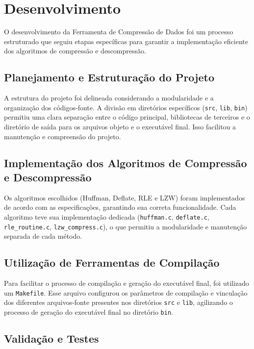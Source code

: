 \chapter{Desenvolvimento}
\label{cap:desenvolvimento}

O desenvolvimento da Ferramenta de Compressão de Dados foi um processo estruturado que seguiu etapas específicas para garantir a implementação eficiente dos algoritmos de compressão e descompressão.

\section{Planejamento e Estruturação do Projeto}

A estrutura do projeto foi delineada considerando a modularidade e a organização dos códigos-fonte. A divisão em diretórios específicos (\texttt{src}, \texttt{lib}, \texttt{bin}) permitiu uma clara separação entre o código principal, bibliotecas de terceiros e o diretório de saída para os arquivos objeto e o executável final. Isso facilitou a manutenção e compreensão do projeto.

\section{Implementação dos Algoritmos de Compressão e Descompressão}

Os algoritmos escolhidos (Huffman, Deflate, RLE e LZW) foram implementados de acordo com as especificações, garantindo sua correta funcionalidade. Cada algoritmo teve sua implementação dedicada (\texttt{huffman.c}, \texttt{deflate.c}, \texttt{rle\_routine.c}, \texttt{lzw\_compress.c}), o que permitiu a modularidade e manutenção separada de cada método.

\section{Utilização de Ferramentas de Compilação}

Para facilitar o processo de compilação e geração do executável final, foi utilizado um \texttt{Makefile}. Esse arquivo configurou os parâmetros de compilação e vinculação dos diferentes arquivos-fonte presentes nos diretórios \texttt{src} e \texttt{lib}, agilizando o processo de geração do executável final no diretório \texttt{bin}.

\section{Validação e Testes}

